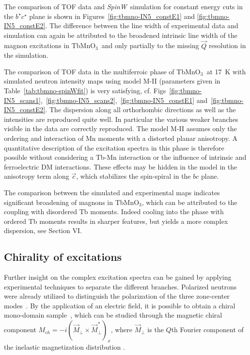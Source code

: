 \documentclass[aps,prb,twocolumn,superscriptaddress,showpacs,floatfix]{revtex4-2}
\newcommand{\tbmno}{TbMnO$_3$}
\newcommand{\spinw}{\textit{SpinW}}
\newcommand{\caxis}{$\vec{c}$}
\begin{document}
The comparison of TOF data and \spinw\ simulation for constant energy cuts in the $b^{\star}c^{\star}$ plane is shown in Figures~\ref{fig:tbmno-IN5_constE1} and \ref{fig:tbmno-IN5_constE2}. The difference between the line width of experimental data and simulation can again be attributed to the broadened intrinsic line width of the magnon excitations in \tbmno\ and only partially to the missing $\vec{Q}$ resolution in the simulation.



The comparison of TOF data in the multiferroic phase of \tbmno\ at \SI{17}{\kelvin} with simulated neutron intensity maps using model M-II (parameters given in Table~\ref{tab:tbmno-spinWfit}) is very satisfying, cf. Figs~\ref{fig:tbmno-IN5_scans1},~\ref{fig:tbmno-IN5_scans2},~\ref{fig:tbmno-IN5_constE1} and~\ref{fig:tbmno-IN5_constE2}. The dispersion along all orthorhombic directions as well as the intensities are reproduced quite well.
In particular the various weaker branches visible in the data are correctly reproduced.
The model M-II assumes only the ordering and interaction of Mn moments with a distorted planar anisotropy. A quantitative description of the excitation spectra in this phase is therefore possible without considering a Tb-Mn interaction or the influence of intrinsic and ferroelectric DM interactions. These effects may be hidden in the model in the anisotropy term along \caxis, which stabilizes the spin-spiral in the $bc$ plane.

The comparison between the simulated and experimental maps indicates significant broadening of magnons in TbMnO$_3$, which can be attributed to the coupling with disordered Tb moments. Indeed cooling into the phase with ordered Tb moments
results in sharper features, but yields a more complex dispersion, see Section VI.


\subsection{Chirality of excitations}

Further insight on the complex excitation spectra can be gained by applying experimental techniques to separate the different branches.
Polarized neutrons were already utilized to distinguish the polarization of the three zone-center modes~\cite{Senff2007}.
By the application of an electric field, it is possible to obtain a chiral mono-domain sample~\cite{Finger2010,Poole2009,Stein2015,Stein2017}, which can be studied through the magnetic chiral component $M_{ch}=-i(\vec{M}_\perp\times\vec{M}^*_\perp)_x$, where $\vec{M}_\perp$ is the $Q$th Fourier component of the inelastic magnetization distribution \cite{Brown2006}.
\end{document}
